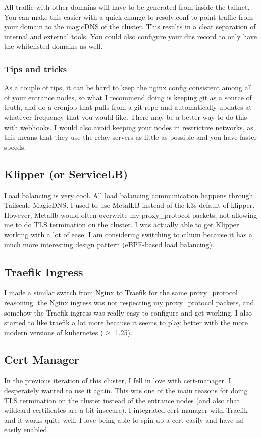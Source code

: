 \documentclass[12pt]{article}
\begin{document}
All traffic with other domains will have to be generated from inside the tailnet. You can make this easier with a quick change to resolv.conf to point traffic from your domain to the magicDNS of the cluster. This results in a clear separation of internal and external tools. You could also configure your dns record to only have the whitelisted domains as well.


\subsubsection{Tips and tricks}
As a couple of tips, it can be hard to keep the nginx config consistent among all of your entrance nodes, so what I recommend doing is keeping git as a source of truth, and do a cronjob that pulls from a git repo and automatically updates at whatever frequency that you would like. There may be a better way to do this with webhooks. I would also avoid keeping your nodes in restrictive networks, as this means that they use the relay servers as little as possible and you have faster speeds.

\subsection{Klipper (or ServiceLB)}
Load balancing is very cool. All load balancing communication happens through Tailscale MagicDNS. I used to use MetalLB instead of the k3s default of klipper. However, Metallb would often overwrite my proxy\_protocol packets, not allowing me to do TLS termination on the cluster. I was actually able to get Klipper working with a lot of ease. I am considering switching to cilium because it has a much more interesting design pattern (eBPF-based load balancing).

\subsection{Traefik Ingress}
I made a similar switch from Nginx to Traefik for the same proxy\_protocol reasoning. the Nginx ingress was not respecting my proxy\_protocol packets, and somehow the Traefik ingress was really easy to configure and get working. I also started to like traefik a lot more because it seems to play better with the more modern versions of kubernetes ($\ge$ 1.25).

\subsection{Cert Manager}
In the previous iteration of this cluster, I fell in love with cert-manager. I desperately wanted to use it again. This was one of the main reasons for doing TLS termination on the cluster instead of the entrance nodes (and also that wildcard certificates are a bit insecure). I integrated cert-manager with Traefik and it works quite well. I love being able to spin up a cert easily and have ssl easily enabled.
\end{document}
